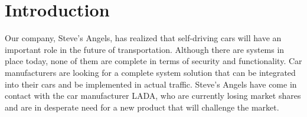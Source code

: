 \documentclass{article}
\begin{document}

\titleformat{\subsubsection}[runin]{\normalsize\bfseries}{}{0pt}{#1\quad\thesubsubsection}


\begingroup
\hypersetup{linkcolor=black}
\tableofcontents
\thispagestyle{empty}
\endgroup
\newpage
\begingroup
\hypersetup{linkcolor=black}
\listoffigures
\thispagestyle{empty}
\endgroup
{}
\newpage
{}

\section{Introduction}
\noindent Our company, Steve's Angels, has realized that self-driving cars will have an important role in the future of transportation. Although there are systems in place today, none of them are complete in terms of security and functionality. Car manufacturers are looking for a complete system solution that can be integrated into their cars and be implemented in actual traffic. Steve's Angels have come in contact with the car manufacturer LADA, who are currently losing market shares and are in desperate need for a new product that will challenge the market. 
\end{document}
